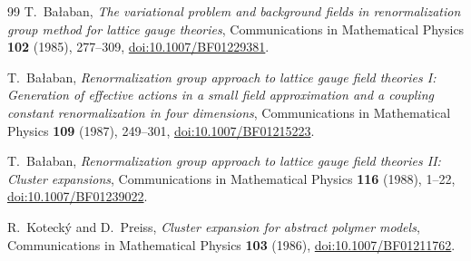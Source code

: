 \documentclass[11pt]{article}
\theoremstyle{definition}
\begin{document}
\begin{thebibliography}{99}
T.~Ba{\l}aban,
\emph{The variational problem and background fields in renormalization
group method for lattice gauge theories},
Communications in Mathematical Physics \textbf{102} (1985), 277--309,
\href{https://doi.org/10.1007/BF01229381}{doi:10.1007/BF01229381}.

T.~Ba{\l}aban,
\emph{Renormalization group approach to lattice gauge field theories I:
Generation of effective actions in a small field approximation and a
coupling constant renormalization in four dimensions},
Communications in Mathematical Physics \textbf{109} (1987), 249--301,
\href{https://doi.org/10.1007/BF01215223}{doi:10.1007/BF01215223}.

T.~Ba{\l}aban,
\emph{Renormalization group approach to lattice gauge field theories II:
Cluster expansions},
Communications in Mathematical Physics \textbf{116} (1988), 1--22,
\href{https://doi.org/10.1007/BF01239022}{doi:10.1007/BF01239022}.

R.~Koteck\'y and D.~Preiss,
\emph{Cluster expansion for abstract polymer models},
Communications in Mathematical Physics \textbf{103} (1986),
\href{https://doi.org/10.1007/BF01211762}{doi:10.1007/BF01211762}.

\end{thebibliography}
\end{document}

